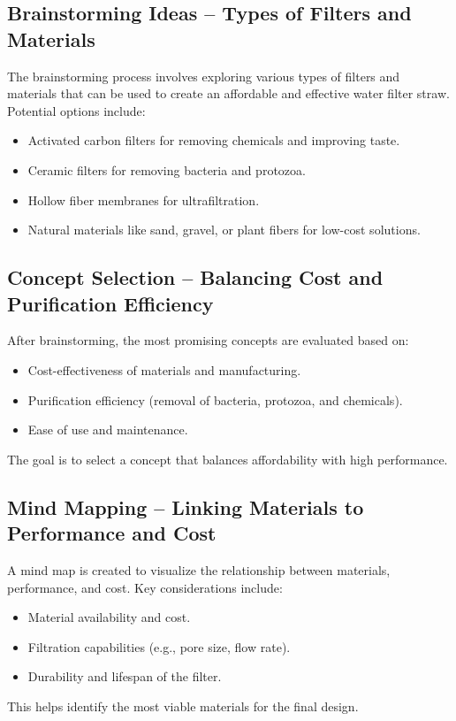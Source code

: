 \documentclass{article}
\begin{document}
\vspace{0.5cm}

\subsection{Brainstorming Ideas – Types of Filters and Materials}
The brainstorming process involves exploring various types of filters and materials that can be used to create an affordable and effective water filter straw. Potential options include:
\begin{itemize}
    \item Activated carbon filters for removing chemicals and improving taste.
    \item Ceramic filters for removing bacteria and protozoa.
    \item Hollow fiber membranes for ultrafiltration.
    \item Natural materials like sand, gravel, or plant fibers for low-cost solutions.
\end{itemize}

\vspace{0.5cm}

\subsection{Concept Selection – Balancing Cost and Purification Efficiency}
After brainstorming, the most promising concepts are evaluated based on:
\begin{itemize}
    \item Cost-effectiveness of materials and manufacturing.
    \item Purification efficiency (removal of bacteria, protozoa, and chemicals).
    \item Ease of use and maintenance.
\end{itemize}
The goal is to select a concept that balances affordability with high performance.

\vspace{0.5cm}

\subsection{Mind Mapping – Linking Materials to Performance and Cost}
A mind map is created to visualize the relationship between materials, performance, and cost. Key considerations include:
\begin{itemize}
    \item Material availability and cost.
    \item Filtration capabilities (e.g., pore size, flow rate).
    \item Durability and lifespan of the filter.
\end{itemize}
This helps identify the most viable materials for the final design.
\end{document}
